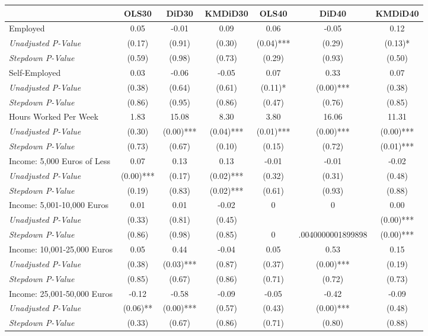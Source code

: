 \begin{tabular}{l c c c c c c}
\toprule
 & OLS30 & DiD30 & KMDiD30 & OLS40 & DiD40 & KMDiD40 \\
\midrule
Employed & 0.05 & -0.01 & 0.09 & 0.06 & -0.05 & 0.12 \\
\quad \textit{Unadjusted P-Value} & (0.17) & (0.91) & (0.30) & (0.04)*** & (0.29) & (0.13)* \\
\quad \textit{Stepdown P-Value} & (0.59) & (0.98) & (0.73) & (0.29) & (0.93) & (0.50) \\
Self-Employed & 0.03 & -0.06 & -0.05 & 0.07 & 0.33 & 0.07 \\
\quad \textit{Unadjusted P-Value} & (0.38) & (0.64) & (0.61) & (0.11)* & (0.00)*** & (0.38) \\
\quad \textit{Stepdown P-Value} & (0.86) & (0.95) & (0.86) & (0.47) & (0.76) & (0.85) \\
Hours Worked Per Week & 1.83 & 15.08 & 8.30 & 3.80 & 16.06 & 11.31 \\
\quad \textit{Unadjusted P-Value} & (0.30) & (0.00)*** & (0.04)*** & (0.01)*** & (0.00)*** & (0.00)*** \\
\quad \textit{Stepdown P-Value} & (0.73) & (0.67) & (0.10) & (0.15) & (0.72) & (0.01)*** \\
Income: 5,000 Euros of Less & 0.07 & 0.13 & 0.13 & -0.01 & -0.01 & -0.02 \\
\quad \textit{Unadjusted P-Value} & (0.00)*** & (0.17) & (0.02)*** & (0.32) & (0.31) & (0.48) \\
\quad \textit{Stepdown P-Value} & (0.19) & (0.83) & (0.02)*** & (0.61) & (0.93) & (0.88) \\
Income: 5,001-10,000 Euros & 0.01 & 0.01 & -0.02 & 0 & 0 & 0.00 \\
\quad \textit{Unadjusted P-Value} & (0.33) & (0.81) & (0.45) & & & (0.00)*** \\
\quad \textit{Stepdown P-Value} & (0.86) & (0.98) & (0.85) & 0 & .0040000001899898 & (0.00)*** \\
Income: 10,001-25,000 Euros & 0.05 & 0.44 & -0.04 & 0.05 & 0.53 & 0.15 \\
\quad \textit{Unadjusted P-Value} & (0.38) & (0.03)*** & (0.87) & (0.37) & (0.00)*** & (0.19) \\
\quad \textit{Stepdown P-Value} & (0.85) & (0.67) & (0.86) & (0.71) & (0.72) & (0.73) \\
Income: 25,001-50,000 Euros & -0.12 & -0.58 & -0.09 & -0.05 & -0.42 & -0.09 \\
\quad \textit{Unadjusted P-Value} & (0.06)** & (0.00)*** & (0.57) & (0.43) & (0.00)*** & (0.48) \\
\quad \textit{Stepdown P-Value} & (0.33) & (0.67) & (0.86) & (0.71) & (0.80) & (0.88) \\
\bottomrule
\end{tabular}
